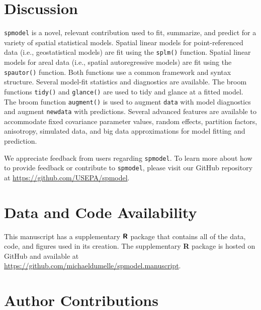 \documentclass[10pt,letterpaper]{article}
\begin{document}
\hypertarget{sec:discussion}{%
\section{Discussion}\label{sec:discussion}}

\texttt{spmodel} is a novel, relevant contribution used to fit,
summarize, and predict for a variety of spatial statistical models.
Spatial linear models for point-referenced data (i.e., geostatistical
models) are fit using the \texttt{splm()} function. Spatial linear
models for areal data (i.e., spatial autoregressive models) are fit
using the \texttt{spautor()} function. Both functions use a common
framework and syntax structure. Several model-fit statistics and
diagnostics are available. The broom functions \texttt{tidy()} and
\texttt{glance()} are used to tidy and glance at a fitted model. The
broom function \texttt{augment()} is used to augment \texttt{data} with
model diagnostics and augment \texttt{newdata} with predictions. Several
advanced features are available to accommodate fixed covariance
parameter values, random effects, partition factors, anisotropy,
simulated data, and big data approximations for model fitting and
prediction.

We appreciate feedback from users regarding \texttt{spmodel}. To learn
more about how to provide feedback or contribute to \texttt{spmodel},
please visit our GitHub repository at
\url{https://github.com/USEPA/spmodel}.

\hypertarget{data-and-code-availability}{%
\section*{Data and Code Availability}\label{data-and-code-availability}}

This manuscript has a supplementary \(\textbf{\textsf{R}}\) package that
contains all of the data, code, and figures used in its creation. The
supplementary \textbf{\textsf{R}} package is hosted on GitHub and
available at \url{https://github.com/michaeldumelle/spmodel.manuscript}.

\hypertarget{author-contributions}{%
\section*{Author Contributions}\label{author-contributions}}
\end{document}

